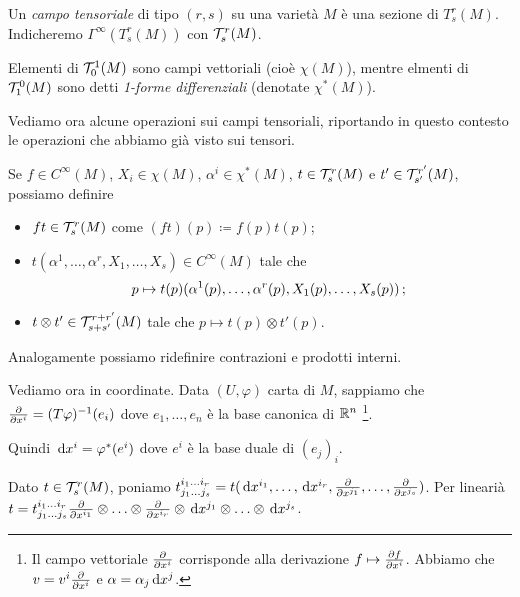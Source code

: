 \begin{definition} 
	Un \emph{campo tensoriale} di tipo $(r,s)$ su una varietà $M$ è una sezione di $T_s^r(M)$. Indicheremo $\Gamma^\infty(T_s^r(M))$ con $\mathcal T_s^r(M)$. %
	
	Elementi di $\mathcal T_0^1(M)$ sono campi vettoriali (cioè $\chi(M)$), mentre elmenti di $\mathcal T_1^0(M)$ sono detti \emph{1-forme differenziali} (denotate $\chi^*(M)$). 
\end{definition}

Vediamo ora alcune operazioni sui campi tensoriali, riportando in questo contesto le operazioni che abbiamo già visto sui tensori. 

Se $f\in C^\infty(M)$, $X_i \in \chi(M)$, $\alpha^i \in \chi^*(M)$, $t \in \mathcal T_s^r(M)$ e $t' \in \mathcal T_{s'}^{r'}(M)$, possiamo definire
\begin{itemize}
	\item $ft \in \mathcal T_s^r(M)$ come $(ft)(p) \coloneqq f(p) t(p)$;
	\item $t(\alpha^1,\ldots,\alpha^r,X_1,\ldots, X_s)\in C^\infty(M)$ tale che
	\begin{equation*}
		p \mapsto t(p)(\alpha^1(p),\ldots,\alpha^r(p),X_1(p),\ldots, X_s(p)) \, \text{; }
	\end{equation*}
	
	\item $t\otimes t' \in \mathcal T_{s+s'}^{r+r'}(M)$ tale che $p \mapsto t(p)\otimes t'(p)$.
\end{itemize}
Analogamente possiamo ridefinire contrazioni e prodotti interni.

Vediamo ora in coordinate. Data $(U,\varphi)$ carta di $M$, sappiamo che $\frac{\partial }{\partial x^i} = (T\varphi)^{-1}(e_i)$ dove $e_1,\ldots, e_n$ è la base canonica di $\mathbb R^n$
\footnote{Il campo vettoriale $\frac{\partial }{\partial x^i}$ corrisponde alla derivazione $f \mapsto \frac{\partial f}{\partial x^i}$. Abbiamo che $v = v^i\frac{\partial }{\partial x^i}$ e $\alpha = \alpha_j \,\mathrm d x^j$.}.

Quindi $\,\mathrm d x^i = \varphi^*(e^i)$ dove $e^i$ è la base duale di $(e_j)_i$. %

Dato $t\in \mathcal T_s^r(M)$, poniamo $t_{j_1\ldots j_s}^{i_1 \ldots i_r} = t(\,\mathrm d x^{i_1}, \ldots, \,\mathrm d x^{i_r}, \frac{\partial }{\partial x^{j_1}}, \ldots, \frac{\partial }{\partial x^{j_s}})$.
Per linearià $t = t_{j_1\ldots j_s}^{i_1 \ldots i_r} \frac{\partial }{\partial x^{i_1}} \otimes \ldots \otimes \frac{\partial }{\partial x^{i_r}} \otimes \,\mathrm d x^{j_1}\otimes \ldots \otimes \,\mathrm d x^{j_s}$.

